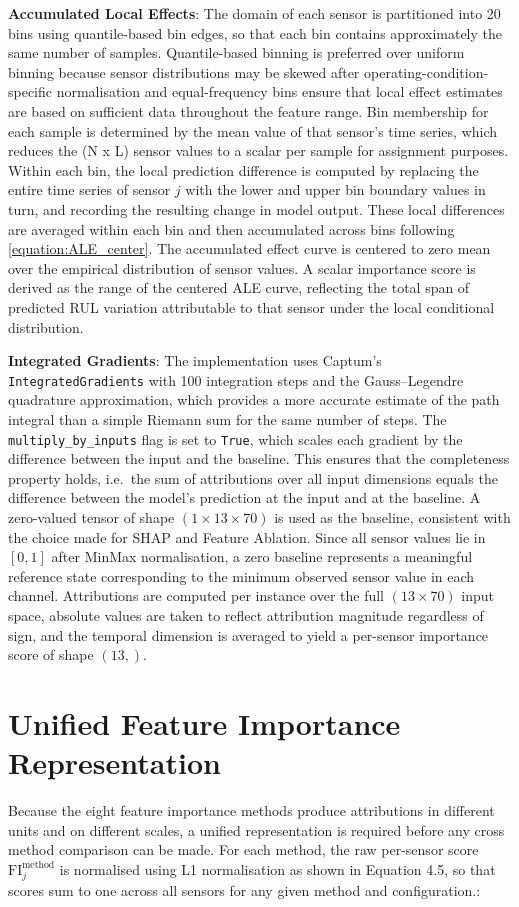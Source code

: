 \textbf{Accumulated Local Effects}: The domain of each sensor is partitioned into 20 bins using quantile-based bin edges, so that each bin contains approximately the same number of samples. Quantile-based binning is preferred over uniform binning because sensor distributions may be skewed after operating-condition-specific normalisation and equal-frequency bins ensure that local effect estimates are based on sufficient data throughout the feature range. Bin membership for each sample is determined by the mean value of that sensor's time series, which reduces the (N x L) sensor values to a scalar per sample for assignment purposes. Within each bin, the local prediction difference is computed by replacing the entire time series of sensor $j$ with the lower and upper bin boundary values in turn, and recording the resulting change in model output. These local differences are averaged within each bin and then accumulated across bins following \ref{equation:ALE_center}. The accumulated effect curve is centered to zero mean over the empirical distribution of sensor values. A scalar importance score is derived as the range of the centered ALE curve, reflecting the total span of predicted RUL variation attributable to that sensor under the local conditional distribution.

\textbf{Integrated Gradients}: The implementation uses Captum's \texttt{IntegratedGradients} with 100 integration steps and the Gauss--Legendre quadrature approximation, which provides a more accurate estimate of the path integral than a simple Riemann sum for the same number of steps. The \texttt{multiply\_by\_inputs} flag is set to \texttt{True}, which scales each gradient by the difference between the input and the baseline. This ensures that the completeness property holds, i.e.\ the sum of attributions over all input dimensions equals the difference between the model's prediction at the input and at the baseline. A zero-valued tensor of shape $(1 \times 13 \times 70)$ is used as the baseline, consistent with the choice made for SHAP and Feature Ablation. Since all sensor values lie in $[0,1]$ after MinMax normalisation, a zero baseline represents a meaningful reference state corresponding to the minimum observed sensor value in each channel. Attributions are computed per instance over the full $(13 \times 70)$ input space, absolute values are taken to reflect attribution magnitude regardless of sign, and the temporal dimension is averaged to yield a per-sensor importance score of shape $(13,)$.

\section{Unified Feature Importance Representation}
Because the eight feature importance methods produce attributions in different units and on different scales, a unified representation is required before any cross method comparison can be made. For each method, the raw per-sensor score $\text{FI}^{\text{method}}_j$ is normalised using L1 normalisation as shown in Equation 4.5, so that scores sum to one across all sensors for any given method and configuration.:

